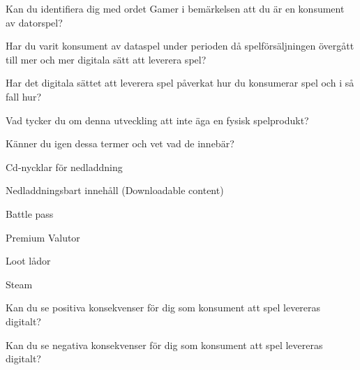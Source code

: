 \documentclass[11p]{article}
\begin{document}
\begin{otherlanguage}{swedish}
        Kan du identifiera dig med ordet Gamer i bemärkelsen att du är en konsument av datorspel?

        Har du varit konsument av dataspel under perioden då spelförsäljningen övergått till mer och mer digitala sätt att leverera spel?

        Har det digitala sättet att leverera spel påverkat hur du konsumerar spel och i så fall hur?

        Vad tycker du om denna utveckling att inte äga en fysisk spelprodukt?

        Känner du igen dessa termer och vet vad de innebär?

        Cd-nycklar för nedladdning

        Nedladdningsbart innehåll  (Downloadable content)

        Battle pass

        Premium Valutor

        Loot lådor

        Steam

        Kan du se positiva konsekvenser för dig som konsument att spel levereras digitalt?

        Kan du se negativa konsekvenser för dig som konsument att spel levereras digitalt?



    \end{otherlanguage}
\end{document}

